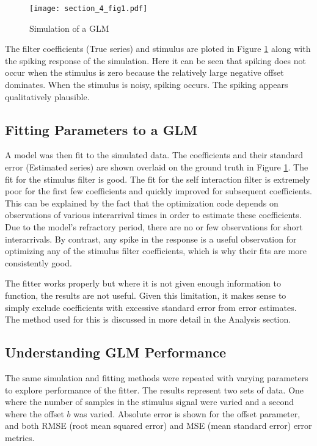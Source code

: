 \documentclass[letterpaper,titlepage,10pt]{article}
\begin{document}
\begin{figure}[H]
\texttt{[image: section\_4\_fig1.pdf]}
\caption{Simulation of a GLM}
\label{fig41}
\end{figure}

The filter coefficients (True series) and stimulus are ploted in Figure \ref{fig41} along with the spiking
response of the simulation. Here it can be seen that spiking does not occur when the stimulus is zero because the
relatively large negative offset dominates. When the stimulus is noisy, spiking occurs. The spiking appears
qualitatively plausible.

\subsection{Fitting Parameters to a GLM}

A model was then fit to the simulated data. The coefficients and their standard error (Estimated series) are shown
overlaid on the ground truth in Figure \ref{fig41}. The fit for the stimulus filter is good. The fit for the
self interaction filter is extremely poor for the first few coefficients and quickly improved for subsequent
coefficients. This can be explained by the fact that the optimization code depends on
observations of various interarrival times in order to estimate these coefficients. Due to the model's refractory
period, there are no or few observations for short interarrivals. By contrast, any spike in the response is a useful
observation for optimizing any of the stimulus filter coefficients, which is why their fits are more consistently good.

The fitter works properly but where it is not given enough information to function, the results are not useful. Given
this limitation, it makes sense to simply exclude coefficients with excessive standard error from error estimates. The
method used for this is discussed in more detail in the Analysis section.

\subsection{Understanding GLM Performance}

The same simulation and fitting methods were repeated with varying parameters to explore performance of the fitter.
The results represent two sets of data. One where the number of samples in the stimulus signal were varied and a
second where the offset $b$ was varied. Absolute error is shown for the offset parameter, and both RMSE (root mean
squared error) and MSE (mean standard error) error metrics.
\end{document}
